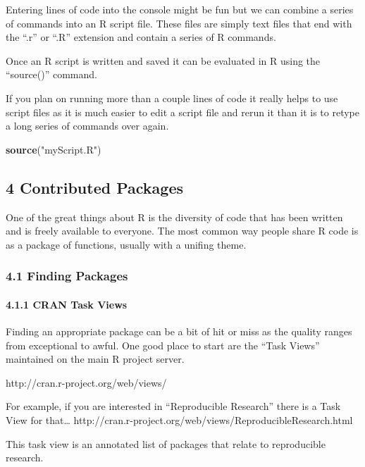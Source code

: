 \documentclass[]{article}
\newenvironment{Shaded}{}{}
\newcommand{\KeywordTok}[1]{\textcolor[rgb]{0.00,0.44,0.13}{\textbf{{#1}}}}
\newcommand{\StringTok}[1]{\textcolor[rgb]{0.25,0.44,0.63}{{#1}}}
\newcommand{\NormalTok}[1]{{#1}}
\begin{document}
Entering lines of code into the console might be fun but we can combine
a series of commands into an R script file. These files are simply text
files that end with the ``.r'' or ``.R'' extension and contain a series
of R commands.

Once an R script is written and saved it can be evaluated in R using the
``source()'' command.

If you plan on running more than a couple lines of code it really helps
to use script files as it is much easier to edit a script file and rerun
it than it is to retype a long series of commands over again.

\begin{Shaded}
\begin{Highlighting}[]
\KeywordTok{source}\NormalTok{(}\StringTok{"myScript.R"}\NormalTok{)}
\end{Highlighting}
\end{Shaded}

\subsection{4 Contributed Packages}

One of the great things about R is the diversity of code that has been
written and is freely available to everyone. The most common way people
share R code is as a package of functions, usually with a unifing theme.

\subsubsection{4.1 Finding Packages}

\paragraph{4.1.1 CRAN Task Views}

Finding an appropriate package can be a bit of hit or miss as the
quality ranges from exceptional to awful. One good place to start are
the ``Task Views'' maintained on the main R project server.

http://cran.r-project.org/web/views/

For example, if you are interested in ``Reproducible Research'' there is
a Task View for that\ldots{}
http://cran.r-project.org/web/views/ReproducibleResearch.html

This task view is an annotated list of packages that relate to
reproducible research.
\end{document}
